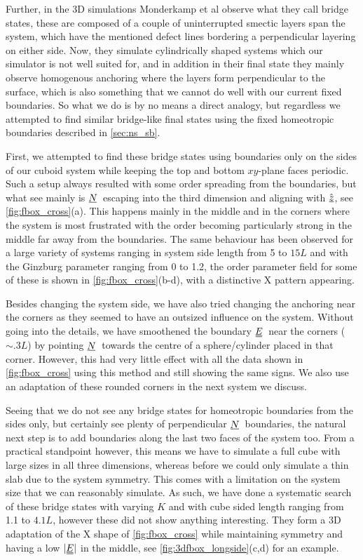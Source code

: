 \documentclass[12pt]{article}
\newcommand{\suf}[2]{\stackunder[0.5pt]{\stackunder[1pt]{\ensuremath{#1}}{\rule{\widthof{\ensuremath{#2}}*\real{0.9}}{.1ex}}}{}}
\newcommand{\duf}[2]{\stackunder[0.5pt]{\stackunder[0.8pt]{\stackunder[1pt]{\ensuremath{#1}}{\rule{\widthof{\ensuremath{#2}}*\real{0.9}}{.1ex}}}{\rule{\widthof{\ensuremath{#2}}*\real{0.9}}{.1ex}}}{}}
\newcommand{\su}[1]{\suf{#1}{#1}}
\newcommand{\du}[1]{\duf{#1}{#1}}
\newcommand{\NN}{\ensuremath{\su{N}}}
\newcommand{\EE}{\ensuremath{\du{E}}}
\begin{document}
        Further, in the 3D simulations Monderkamp et al observe what they call bridge states\cite{a.monderkampTopologicalFineStructure2022}, these are composed of a couple of uninterrupted smectic layers span the system, which have the mentioned defect lines bordering a perpendicular layering on either side.
        Now, they simulate cylindrically shaped systems which our simulator is not well suited for, and in addition in their final state they mainly observe homogenous anchoring where the layers form perpendicular to the surface, which is also something that we cannot do well with our current fixed boundaries.
        So what we do is by no means a direct analogy, but regardless we attempted to find similar bridge-like final states using the fixed homeotropic boundaries described in \cref{sec:ns_sb}.

        First, we attempted to find these bridge states using boundaries only on the sides of our cuboid system while keeping the top and bottom $xy$-plane faces periodic.
        Such a setup always resulted with some order spreading from the boundaries, but what see mainly is \NN\ escaping into the third dimension and aligning with $\hat{\su{z}}$, see \cref{fig:fbox_cross}(a).
        This happens mainly in the middle and in the corners where the system is most frustrated with the order becoming particularly strong in the middle far away from the boundaries.
        The same behaviour has been observed for a large variety of systems ranging in system side length from 5 to $15\si{L}$ and with the Ginzburg parameter ranging from 0 to 1.2, the order parameter field for some of these is shown in \cref{fig:fbox_cross}(b-d), with a distinctive X pattern appearing.

        Besides changing the system side, we have also tried changing the anchoring near the corners as they seemed to have an outsized influence on the system.
        Without going into the details, we have smoothened the boundary \EE\ near the corners (${\sim}.3\si{L}$) by pointing \NN\ towards the centre of a sphere/cylinder placed in that corner.
        However, this had very little effect with all the data shown in \cref{fig:fbox_cross} using this method and still showing the same signs.
        We also use an adaptation of these rounded corners in the next system we discuss.

        Seeing that we do not see any bridge states for homeotropic boundaries from the sides only, but certainly see plenty of perpendicular \NN\ boundaries, the natural next step is to add boundaries along the last two faces of the system too.
        From a practical standpoint however, this means we have to simulate a full cube with large sizes in all three dimensions, whereas before we could only simulate a thin slab due to the system symmetry.
        This comes with a limitation on the system size that we can reasonably simulate.
        As such, we have done a systematic search of these bridge states with varying $K$ and with cube sided length ranging from 1.1 to $4.1\si{L}$, however these did not show anything interesting.
        They form a 3D adaptation of the X shape of \cref{fig:fbox_cross} while maintaining symmetry and having a low $|\EE|$ in the middle, see \cref{fig:3dfbox_longside}(c,d) for an example.
\end{document}
